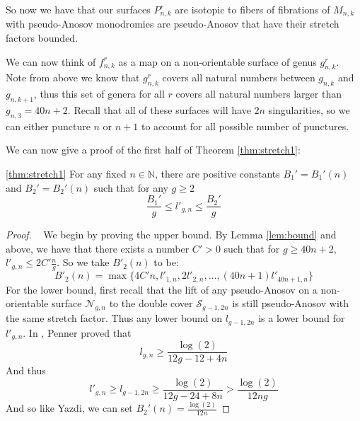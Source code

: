 So now we have that our surfaces $P^r_{n,k}$ are isotopic to fibers of fibrations of $M_{n,k}$ with pseudo-Anosov monodromies are pseudo-Anosov that have their stretch factors bounded.

We can now think of $f^r_{n,k}$ as a map on a non-orientable surface of genus $g^r_{n,k}$. Note from above we know that $g^r_{n,k}$ covers all natural numbers between $g_{n,k}$ and $g_{n,k+1}$, thus this set of genera for all $r$ covers all natural numbers larger than $g_{n,3} = 40n + 2$. Recall that all of these surfaces will have $2n$ singularities, so we can either puncture $n$ or $n + 1$ to account for all possible number of punctures.

We can now give a proof of the first half of Theorem \ref{thm:stretch1}:

\begin{manualtheorem}{\ref{thm:stretch1}}
For any fixed $n \in \mathbb{N}$, there are positive constants $B_1' = B_1'(n)$ and $B_2' = B_2'(n)$ such that for any $g \geq 2$
$$\frac{B_1'}{g} \leq l'_{g,n} \leq \frac{B_2'}{g}$$
\end{manualtheorem}
\begin{proof}
    ~
    We begin by proving the upper bound. By Lemma \ref{lem:bound} and above, we have that there exists a number $C' > 0$ such that for $g \geq 40n + 2$, $l'_{g,n} \leq 2C'\frac{n}{g}$. So we take $B'_2(n)$ to be:
    $$B'_2(n) = \max\{4C'n, l'_{1,n}, 2l'_{2,n}, \dots, (40n + 1)l'_{40n+1,n}\}$$
    For the lower bound, first recall that the lift of any pseudo-Anosov on a non-orientable surface $\mathcal{N}_{g,n}$ to the double cover $\mathcal{S}_{g-1,2n}$ is still pseudo-Anosov with the same stretch factor. Thus any lower bound on $l_{g-1,2n}$ is a lower bound for $l'_{g,n}$. In \cite{penner1991bounds}, Penner proved that
    $$l_{g,n} \geq \frac{\log(2)}{12g - 12 + 4n}$$
    And thus $$l'_{g,n} \geq l_{g-1,2n} \geq \frac{\log(2)}{12g - 24 + 8n} > \frac{\log(2)}{12ng}$$
    And so like Yazdi, we can set $B_2'(n) = \frac{\log(2)}{12n}$
\end{proof}
